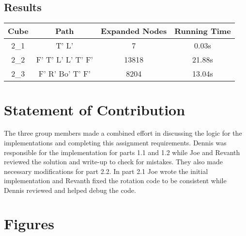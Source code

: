 \documentclass{article}
\begin{document}
\subsection{Results}

\begin{center}
\begin{tabular}{|c|c|c|c|}
\hline\textbf{Cube} & \textbf{Path} & \textbf{Expanded Nodes} & \textbf{Running Time} \\
\hline\hline 2\_1 & T' L' & 7 & 0.03s \\
\hline 2\_2 & F' T' L' L' T' F' & 13818 & 21.88s \\
\hline 2\_3 & F' R' Bo' T' F' & 8204 & 13.04s \\
\hline
\end{tabular}
\end{center}

\section{Statement of Contribution}

The three group members made a combined effort in discussing the logic for the implementations and completing this assignment requirements. Dennis was responsible for the implementation for parts 1.1 and 1.2 while Joe and Revanth reviewed the solution and write-up to check for mistakes. They also made necessary modifications for part 2.2. In part 2.1 Joe wrote the initial implementation and Revanth fixed the rotation code to be consistent while Dennis reviewed and helped debug the code.


\newpage

\section{Figures}
\label{sect:figs}
\end{document}
